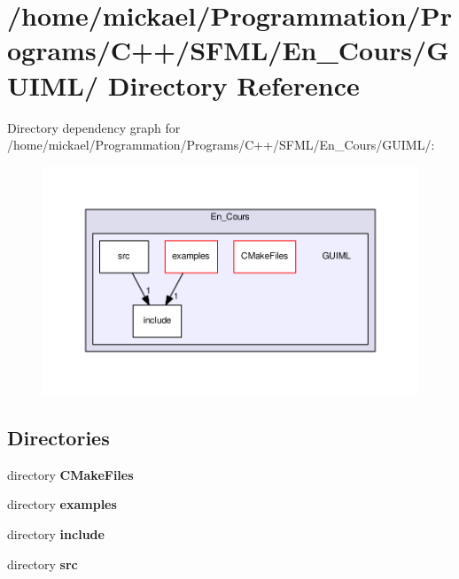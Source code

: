 \section{/home/mickael/\-Programmation/\-Programs/\-C++/\-S\-F\-M\-L/\-En\-\_\-\-Cours/\-G\-U\-I\-M\-L/ Directory Reference}
\label{dir_33ee0b9323ee5b5e608d27f53de84f49}
Directory dependency graph for /home/mickael/\-Programmation/\-Programs/\-C++/\-S\-F\-M\-L/\-En\-\_\-\-Cours/\-G\-U\-I\-M\-L/\-:\nopagebreak
\begin{figure}[H]
\begin{center}
\leavevmode
\includegraphics[width=350pt]{dir_33ee0b9323ee5b5e608d27f53de84f49_dep}
\end{center}
\end{figure}
\subsection*{Directories}
\begin{DoxyCompactItemize}
\item 
directory {\bf C\-Make\-Files}
\item 
directory {\bf examples}
\item 
directory {\bf include}
\item 
directory {\bf src}
\end{DoxyCompactItemize}
